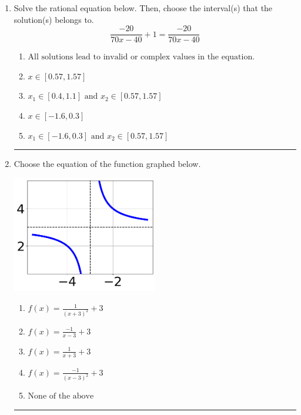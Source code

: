 \documentclass[14pt]{extbook}
\newcommand{\litem}[1]{\item#1\hspace*{-1cm}\rule{\textwidth}{0.4pt}}
\begin{document}
\begin{enumerate}
{\begin{enumerate}[label=\Alph*.]
\end{enumerate} }
\litem{
Solve the rational equation below. Then, choose the interval(s) that the solution(s) belongs to.\[ \frac{-20}{70x -40} + 1 = \frac{-20}{70x -40} \]\begin{enumerate}[label=\Alph*.]
\item \( \text{All solutions lead to invalid or complex values in the equation.} \)
\item \( x \in [0.57,1.57] \)
\item \( x_1 \in [0.4, 1.1] \text{ and } x_2 \in [0.57,1.57] \)
\item \( x \in [-1.6,0.3] \)
\item \( x_1 \in [-1.6, 0.3] \text{ and } x_2 \in [0.57,1.57] \)

\end{enumerate} }
\litem{
Choose the equation of the function graphed below.
\begin{center}
    \includegraphics[width=0.5\textwidth]{../Figures/rationalGraphToEquationB.png}
\end{center}
\begin{enumerate}[label=\Alph*.]
\item \( f(x) = \frac{1}{(x + 3)^2} + 3 \)
\item \( f(x) = \frac{-1}{x - 3} + 3 \)
\item \( f(x) = \frac{1}{x + 3} + 3 \)
\item \( f(x) = \frac{-1}{(x - 3)^2} + 3 \)
\item \( \text{None of the above} \)


\end{enumerate}}
\end{enumerate}
\end{document}
